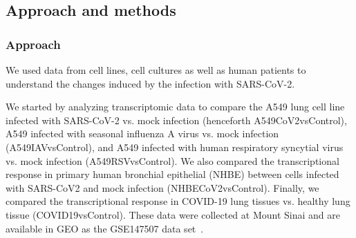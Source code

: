 \documentclass[Minh_PhD_thesis.tex]{subfiles}
\begin{document}






\subsection{Approach and methods}

\subsubsection{Approach}

We used data from cell lines, cell cultures as well as human patients to understand the changes induced by the infection with SARS-CoV-2. 


We started by analyzing transcriptomic data to compare the A549 lung cell line infected with SARS-CoV-2 vs. mock infection  (henceforth A549CoV2vsControl), A549 infected with seasonal influenza A virus vs. mock infection   (A549IAVvsControl), and A549 infected with human respiratory syncytial virus vs. mock infection  (A549RSVvsControl). We also compared the transcriptional response in primary human bronchial epithelial (NHBE) between cells infected with SARS-CoV2 and mock infection  (NHBECoV2vsControl). Finally, we compared the transcriptional response in COVID-19 lung tissues vs. healthy lung tissue  (COVID19vsControl). 
These data were collected at Mount Sinai and are available in GEO as the GSE147507 data set~\cite{Blanco-Melo:2020}. 
\end{document}
